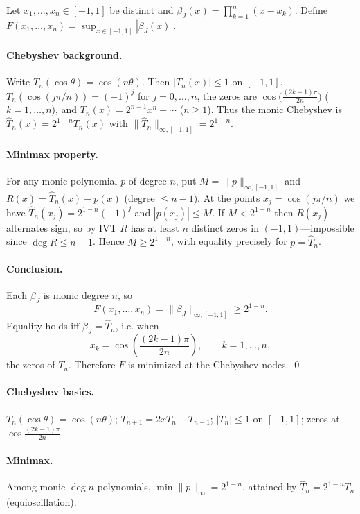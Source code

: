 \documentclass[11pt,a4paper]{article}
\theoremstyle{definition}
\theoremstyle{definition}
\theoremstyle{plain}
\theoremstyle{remark}
\begin{document}
Let $x_1,\dots,x_n\in[-1,1]$ be distinct and $\beta_J(x)=\prod_{k=1}^n(x-x_k)$.
Define $F(x_1,\dots,x_n)=\sup_{x\in[-1,1]}|\beta_J(x)|$.

\paragraph{Chebyshev background.}
Write $T_n(\cos\theta)=\cos(n\theta)$.
Then $|T_n(x)|\le1$ on $[-1,1]$, $T_n(\cos(j\pi/n))=(-1)^j$ for $j=0,\dots,n$,
the zeros are $\cos\!\big(\frac{(2k-1)\pi}{2n}\big)$ ($k=1,\dots,n$), and
$T_n(x)=2^{n-1}x^n+\cdots$ ($n\ge1$).
Thus the monic Chebyshev is $\widehat T_n(x)=2^{1-n}T_n(x)$ with
$\|\widehat T_n\|_{\infty,[-1,1]}=2^{1-n}$.

\paragraph{Minimax property.}
For any monic polynomial $p$ of degree $n$, put $M=\|p\|_{\infty,[-1,1]}$ and
$R(x)=\widehat T_n(x)-p(x)$ (degree $\le n-1$).
At the points $x_j=\cos(j\pi/n)$ we have
$\widehat T_n(x_j)=2^{1-n}(-1)^j$ and $|p(x_j)|\le M$.
If $M<2^{1-n}$ then $R(x_j)$ alternates sign, so by IVT $R$ has at least $n$
distinct zeros in $(-1,1)$—impossible since $\deg R\le n-1$.
Hence $M\ge2^{1-n}$, with equality precisely for $p=\widehat T_n$.

\paragraph{Conclusion.}
Each $\beta_J$ is monic degree $n$, so
\[
F(x_1,\dots,x_n)=\|\beta_J\|_{\infty,[-1,1]}\ge2^{1-n}.
\]
Equality holds iff $\beta_J=\widehat T_n$, i.e. when
\[
x_k=\cos\!\left(\frac{(2k-1)\pi}{2n}\right),\qquad k=1,\dots,n,
\]
the zeros of $T_n$. Therefore $F$ is minimized at the Chebyshev nodes.
\qed

\paragraph{Chebyshev basics.}
$T_n(\cos\theta)=\cos(n\theta)$; $T_{n+1}=2xT_n-T_{n-1}$; 
$|T_n|\le1$ on $[-1,1]$; zeros at $\cos\frac{(2k-1)\pi}{2n}$.

\paragraph{Minimax.}
Among monic $\deg n$ polynomials, $\min\|p\|_\infty=2^{1-n}$, attained by 
$\widehat T_n=2^{1-n}T_n$ (equioscillation).
\end{document}
